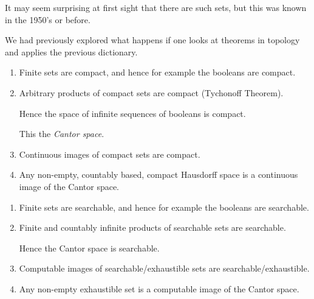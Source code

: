\documentclass%
[%
Screen4to3,
]{foils}
\begin{document}
\vfill

It may seem surprising at first sight that there are
such sets, but this was known in the 1950's or
before.


\begin{quote}
\end{quote}


We had previously explored what happens if one looks at theorems in
topology and applies the previous dictionary.





\begin{enumerate}
\item[\grey{1.}] Finite sets are compact, and hence for example the booleans are compact.

\item[\grey{2.}] Arbitrary products of compact sets are compact (Tychonoff
  Theorem). 

  Hence the space of infinite sequences of booleans is compact. 

  This the \emph{Cantor space}.

\item[\grey{2.}] Continuous images of compact sets are compact.

\item[\grey{3.}] Any non-empty, countably based, compact Hausdorff space
is a continuous image of the Cantor space. 
\end{enumerate}

\begin{enumerate}
\item[\grey{1.}] \label{cs:land:1} Finite sets are searchable, and hence for example the booleans are searchable.
\item[\grey{2.}] \label{cs:land:2}Finite and countably infinite products of searchable sets are
  searchable.

  Hence the Cantor space is searchable. 

\item[\grey{3.}] \label{cs:land:3} Computable images of searchable/exhaustible sets are  searchable/exhaustible.
\item[\grey{4.}] \label{cs:land:4} Any non-empty exhaustible set is a computable
  image of the Cantor space.
\end{enumerate}
\end{document}
